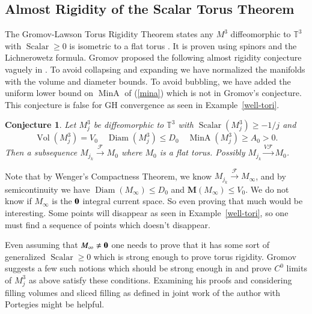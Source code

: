 \documentclass[12pt]{amsart}
\newtheorem{conj}[thm]{Conjecture}
\begin{document}
\subsection{Almost Rigidity of the Scalar Torus Theorem}
\label{sect-torus}

The Gromov-Lawson Torus Rigidity Theorem states any $M^3$ diffeomorphic
to ${\mathbb{T}}^3$ with ${\operatorname{Scalar}} \ge 0$ is isometric to a flat torus \cite{Gromov-Lawson-1980}.  It is proven using spinors and the Lichnerowetz formula.
Gromov proposed the following almost rigidity
conjecture vaguely in \cite{Gromov-Dirac}.    To avoid collapsing and expanding we have normalized the manifolds with the volume and diameter bounds.
To avoid bubbling, we have added the uniform lower bound on ${\operatorname{MinA}}$
of (\ref{mina}) which is not in Gromov's conjecture.
This conjecture is false for GH convergence as seen in Example~\ref{well-tori}.

\begin{conj}
Let $M_j^3$ be diffeomorphic to $\mathbb{T}^3$
with  ${\operatorname{Scalar}}(M_j^3) \ge -1/j$ and 
\begin{equation}
{\operatorname{Vol}}(M_j^3)=V_0 \quad {\operatorname{Diam}}(M_j^3)\le D_0 \quad {\operatorname{MinA}}(M_j^3)\ge A_0>0.   
\end{equation}
Then a subsequence $M_{j_k} {\stackrel {\mathcal{F}}{\longrightarrow} } M_0$ where $M_0$ is a flat torus.
Possibly $M_{j_k} {\stackrel {V\mathcal{F}}{\longrightarrow} } M_0$.
\end{conj}

Note that by Wenger's Compactness Theorem, we know $M_{j_k} {\stackrel {\mathcal{F}}{\longrightarrow} } M_\infty$,
and by semicontinuity we have ${\operatorname{Diam}}(M_\infty) \le D_0$ and 
${{\mathbf M}}(M_\infty)\le V_0$.   We do not know if $M_\infty$ is the ${\bf{0}}$
integral current space.  So even proving that much would be interesting.
Some points will disappear as seen in Example~\ref{well-tori}, so one must find
a sequence of points which doesn't disappear.

Even assuming that $M_\infty\neq {\bf{0}}$ one needs to prove that it has
some sort of generalized ${\operatorname{Scalar}} \ge 0$ which is strong enough to prove torus rigidity.   Gromov suggests a few such notions which should be strong enough
in \cite{Gromov-Dirac} and prove $C^0$ limits of $M^3_j$ as above satisfy
these conditions. Examining his proofs and considering filling volumes 
and sliced filling as defined
in joint work of the author with Portegies \cite{Sormani-properties} might be helpful.
\end{document}
